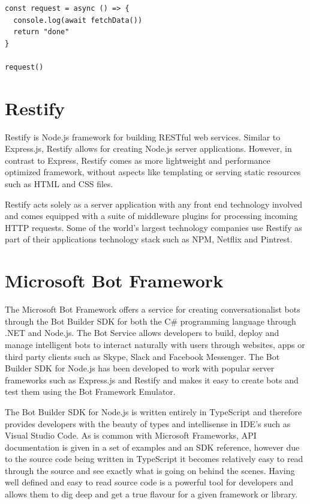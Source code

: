 \begin{verbatim}
const request = async () => {
  console.log(await fetchData())
  return "done"
}

request()
\end{verbatim}
\section{Restify}
Restify is Node.js framework for building RESTful web services\cite{restify}. Similar to Express.js\cite{express}, Restify allows for creating Node.js server applications. However, in contrast to Express, Restify comes as more lightweight and performance optimized framework, without aspects like templating or serving static resources such as HTML and CSS files.

Restify acts solely as a server application with any front end technology involved and comes equipped with a suite of middleware plugins\cite{restify} for processing incoming HTTP requests. Some of the world's largest technology companies use Restify as part of their applications technology stack such as NPM, Netflix and Pintrest\cite{restify}.

\section{Microsoft Bot Framework}
The Microsoft Bot Framework\cite{msbotframework} offers a service for creating conversationalist bots through the Bot Builder SDK for both the C\# programming language through .NET and Node.js. The Bot Service allows developers to build, deploy and manage intelligent bots to interact naturally with users through websites, apps or third party clients such as Skype, Slack and Facebook Messenger\cite{msbotframework}. The Bot Builder SDK for Node.js has been developed to work with popular server frameworks such as Express.js\cite{express} and Restify\cite{restify} and makes it easy to create bots and test them using the Bot Framework Emulator\cite{botemulator}.

The Bot Builder SDK for Node.js is written entirely in TypeScript and therefore provides developers with the beauty of types and intellisense in IDE's such as Visual Studio Code\cite{vscode}. As is common with Microsoft Frameworks, API documentation is given in a set of examples and an SDK reference, however due to the source code being written in TypeScript it becomes relatively easy to read through the source and see exactly what is going on behind the scenes. Having well defined and easy to read source code is a powerful tool for developers and allows them to dig deep and get a true flavour for a given framework or library.


